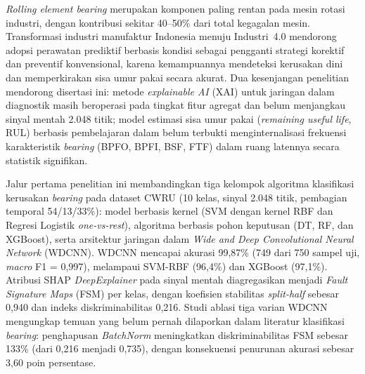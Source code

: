 ﻿%

\begin{abstractid}

\emph{Rolling element bearing} merupakan komponen paling rentan pada mesin rotasi
industri, dengan kontribusi sekitar 40--50\% dari total kegagalan mesin.
Transformasi industri manufaktur Indonesia menuju Industri~4.0 mendorong
adopsi perawatan prediktif berbasis kondisi sebagai pengganti strategi
korektif dan preventif konvensional, karena kemampuannya mendeteksi
kerusakan dini dan memperkirakan sisa umur pakai secara akurat.
Dua kesenjangan penelitian mendorong disertasi ini: metode
\emph{explainable AI} (XAI) untuk jaringan dalam diagnostik masih
beroperasi pada tingkat fitur agregat dan belum menjangkau sinyal mentah
2.048 titik; model estimasi sisa umur pakai (\emph{remaining useful life},
RUL) berbasis pembelajaran dalam belum terbukti menginternalisasi frekuensi
karakteristik \emph{bearing} (BPFO, BPFI, BSF, FTF) dalam ruang latennya
secara statistik signifikan.

Jalur pertama penelitian ini membandingkan tiga kelompok algoritma
klasifikasi kerusakan \emph{bearing} pada dataset CWRU (10 kelas, sinyal 2.048
titik, pembagian temporal 54/13/33\%): model berbasis kernel (SVM dengan
kernel RBF dan Regresi Logistik \emph{one-vs-rest}), algoritma berbasis
pohon keputusan (DT, RF, dan XGBoost), serta arsitektur jaringan dalam
\emph{Wide and Deep Convolutional Neural Network} (WDCNN).
WDCNN mencapai akurasi 99,87\% (749 dari 750 sampel uji,
\emph{macro} F1 = 0,997), melampaui SVM-RBF (96,4\%) dan XGBoost
(97,1\%).
Atribusi SHAP \emph{DeepExplainer} pada sinyal mentah diagregasikan
menjadi \emph{Fault Signature Maps} (FSM) per kelas, dengan koefisien
stabilitas \emph{split-half} sebesar 0,940 dan indeks diskriminabilitas
0,216.
Studi ablasi tiga varian WDCNN mengungkap temuan yang belum pernah
dilaporkan dalam literatur klasifikasi \emph{bearing}: penghapusan
\emph{BatchNorm} meningkatkan diskriminabilitas FSM sebesar 133\% (dari
0,216 menjadi 0,735), dengan konsekuensi penurunan akurasi sebesar
3,60 poin persentase.


\end{abstractid}
